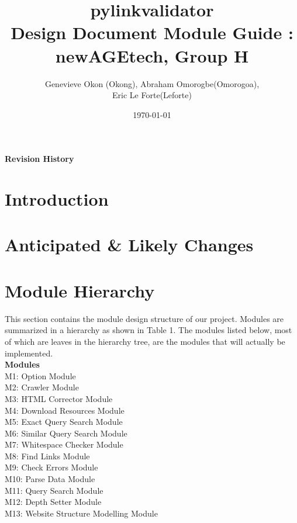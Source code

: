 \documentclass[titlepage]{article}
\begin{document}
\title{pylinkvalidator \\
 Design Document Module Guide : newAGEtech, Group H }
\author{Genevieve Okon (Okong), Abraham Omorogbe(Omorogoa),\\
 Eric Le Forte(Leforte)}
\date{\today}
\maketitle


\tableofcontents
\listoffigures
\listoftables

\textbf{Revision History} \\ \normalsize
\pagebreak

\section{Introduction}


\section{Anticipated \& Likely Changes}


\section{Module Hierarchy}
This section contains the module design structure of our project. Modules are summarized in a hierarchy as shown in Table 1. The modules listed below, most of which are leaves in the hierarchy tree, are the modules that will actually be implemented.
\\

\textbf{Modules}\\

M1: Option Module\\
M2: Crawler Module\\
M3: HTML Corrector Module\\
M4: Download Resources Module\\
M5: Exact Query Search Module\\
M6: Similar Query Search Module\\
M7: Whitespace Checker Module\\
M8: Find Links Module\\
M9: Check Errors Module\\
M10: Parse Data Module\\
M11: Query Search Module\\
M12: Depth Setter Module\\
M13: Website Structure Modelling Module\\
\end{document}
